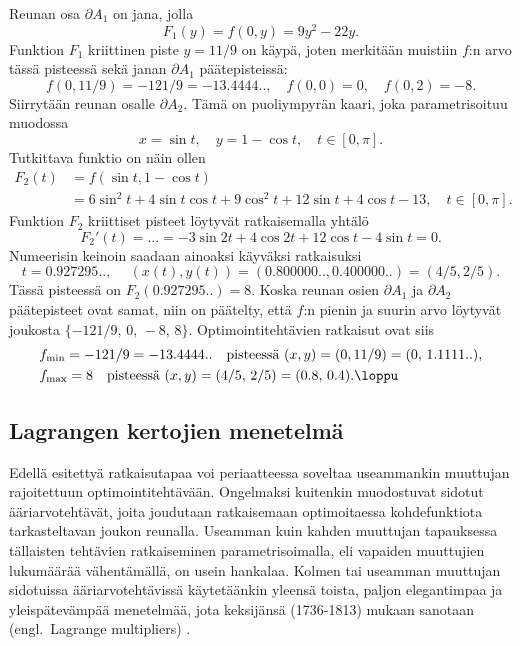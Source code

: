 Reunan osa $\partial A_1$ on jana, jolla
\[ 
F_1(y) = f(0,y) = 9y^2-22y. 
\]
Funktion $F_1$ kriittinen piste $y=11/9$ on käypä, joten merkitään muistiin $f$:n arvo tässä 
pisteessä sekä janan $\partial A_1$ päätepisteissä:
\[
f(0,11/9) = -121/9 = -13.4444.., \quad f(0,0)=0, \quad f(0,2) = -8. 
\]
Siirrytään reunan osalle $\partial A_2$. Tämä on puoliympyrän kaari, joka parametrisoituu 
muodossa
\[ 
x = \sin t, \quad y=1-\cos t, \quad t \in [0,\pi]. 
\]
Tutkittava funktio on näin ollen
\begin{align*}
 F_2(t) &= f(\sin t,1-\cos t) \\
        &= 6\sin^2t+4\sin t\cos t+9\cos^2 t+12\sin t+4\cos t-13, \quad t \in [0,\pi].
\end{align*}
Funktion $F_2$ kriittiset pisteet löytyvät ratkaisemalla yhtälö
\[ 
F_2'(t)= \ldots = -3\sin 2t + 4\cos 2t + 12\cos t - 4\sin t = 0. 
\]
Numeerisin keinoin saadaan ainoaksi käyväksi ratkaisuksi
\[ 
t = 0.927295 .., \quad\ (x(t),y(t)) = (0.800000..,0.400000..) = (4/5,2/5). 
\]
Tässä pisteessä on $F_2(0.927295..) = 8$. Koska reunan osien $\partial A_1$ ja $\partial A_2$
päätepisteet ovat samat, niin on päätelty, että $f$:n pienin ja suurin arvo löytyvät joukosta
$\{-121/9,\,0,\,-8,\,8\}$. Optimointitehtävien ratkaisut ovat siis
\begin{align*}
&f_{\text{min}} = -121/9 = -13.4444.. \quad 
                               \text{pisteessä}\ (x,y) = (0,11/9) = (0,\,1.1111..), \\
&f_{\text{max}} = 8 \quad \text{pisteessä}\ (x,y) = (4/5,\,2/5) = (0.8,\,0.4). \loppu
\end{align*}

\subsection*{Lagrangen kertojien menetelmä}

Edellä esitettyä ratkaisutapaa voi periaatteessa soveltaa useammankin muuttujan rajoitettuun
optimointitehtävään. Ongelmaksi kuitenkin muodostuvat sidotut ääriarvotehtävät, joita joudutaan
ratkaisemaan optimoitaessa kohdefunktiota tarkasteltavan joukon reunalla. Useamman kuin kahden
muuttujan tapauksessa tällaisten tehtävien ratkaiseminen parametrisoimalla, eli vapaiden
muuttujien lukumäärää vähentämällä, on usein hankalaa. Kolmen tai useamman muuttujan sidotuissa 
ääriarvotehtävissä käytetäänkin yleensä toista, paljon elegantimpaa ja yleispätevämpää
menetelmää, jota keksijänsä  (1736-1813) mukaan sanotaan 
 (engl.\ Lagrange multipliers) . 


